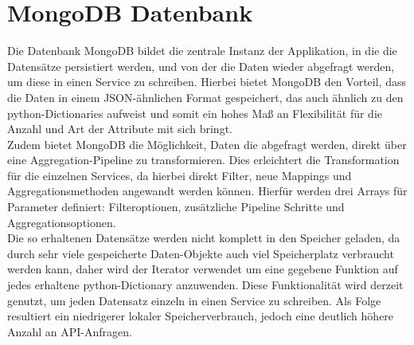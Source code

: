 \section{MongoDB Datenbank}
Die Datenbank MongoDB bildet die zentrale Instanz der Applikation, in die die Datensätze persistiert werden, und von der die Daten wieder abgefragt werden, um diese in einen Service zu schreiben. Hierbei bietet MongoDB den Vorteil, dass die Daten in einem JSON-ähnlichen Format gespeichert, das auch ähnlich zu den python-Dictionaries aufweist und somit ein hohes Maß an Flexibilität für die Anzahl und Art der Attribute mit sich bringt.\\
Zudem bietet MongoDB die Möglichkeit, Daten die abgefragt werden, direkt über eine Aggregation-Pipeline zu transformieren. Dies erleichtert die Transformation für die einzelnen Services, da hierbei direkt Filter, neue Mappings und Aggregationsmethoden angewandt werden können. Hierfür werden drei Arrays für Parameter definiert: Filteroptionen, zusätzliche Pipeline Schritte und Aggregationsoptionen. \\
Die so erhaltenen Datensätze werden nicht komplett in den Speicher geladen, da durch sehr viele gespeicherte Daten-Objekte auch viel Speicherplatz verbraucht werden kann, daher wird der Iterator verwendet um eine gegebene Funktion auf jedes erhaltene python-Dictionary anzuwenden. Diese Funktionalität wird derzeit genutzt, um jeden Datensatz einzeln in einen Service zu schreiben. Als Folge resultiert ein niedrigerer lokaler Speicherverbrauch, jedoch eine deutlich höhere Anzahl an API-Anfragen.  